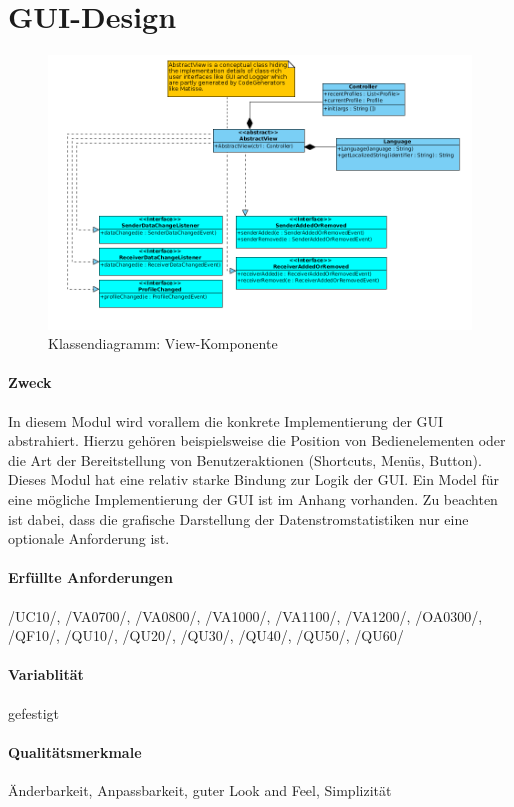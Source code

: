 \section{GUI-Design}
\label{sec:4:konf}
\begin{figure}[H]
\includegraphics[width=15cm]{images/View.png}
\centering
\caption{Klassendiagramm: View-Komponente}
\label{uml_controller}
\end{figure}

\paragraph{Zweck}
In diesem Modul wird vorallem die konkrete Implementierung der GUI abstrahiert. 
Hierzu gehören beispielsweise die Position von Bedienelementen oder
die Art der Bereitstellung von Benutzeraktionen (Shortcuts, Menüs, Button). 
Dieses Modul hat eine relativ starke Bindung zur Logik der GUI. Ein Model für
eine mögliche Implementierung der GUI ist im Anhang vorhanden. Zu beachten ist
dabei, dass die grafische Darstellung der Datenstromstatistiken nur eine
optionale Anforderung ist.
\paragraph{Erfüllte Anforderungen}
/UC10/, /VA0700/, /VA0800/, /VA1000/, /VA1100/, /VA1200/, /OA0300/, /QF10/, /QU10/, /QU20/, /QU30/, /QU40/, /QU50/, /QU60/
\paragraph{Variablität}
gefestigt
\paragraph{Qualitätsmerkmale}
Änderbarkeit, Anpassbarkeit, guter Look and Feel, Simplizität
